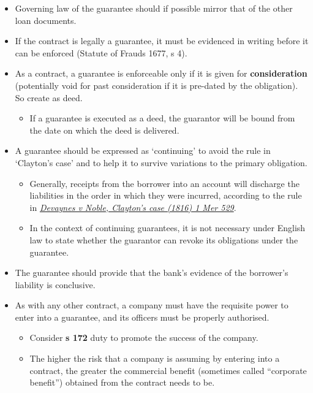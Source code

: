 \documentclass[
]{article}
\providecommand{\tightlist}{%
  \setlength{\itemsep}{0pt}\setlength{\parskip}{0pt}}
\begin{document}
\begin{itemize}
\tightlist
\item
  Governing law of the guarantee should if possible mirror that of the
  other loan documents.
\item
  If the contract is legally a guarantee, it must be evidenced in
  writing before it can be enforced (Statute of Frauds 1677, s 4).
\item
  As a contract, a guarantee is enforceable only if it is given for
  \textbf{consideration} (potentially void for past consideration if it
  is pre-dated by the obligation). So create as deed.

  \begin{itemize}
  \tightlist
  \item
    If a guarantee is executed as a deed, the guarantor will be bound
    from the date on which the deed is delivered.
  \end{itemize}
\item
  A guarantee should be expressed as `continuing' to avoid the rule in
  `Clayton's case' and to help it to survive variations to the primary
  obligation.

  \begin{itemize}
  \tightlist
  \item
    Generally, receipts from the borrower into an account will discharge
    the liabilities in the order in which they were incurred, according
    to the rule in
    \emph{\href{https://uk.westlaw.com/D-000-4111?originationContext=document\&transitionType=PLDocumentLink\&contextData=\%28sc.Default\%29\&comp=pluk}{Devaynes
    v Noble, Clayton's case (1816) 1 Mer 529}}.
  \item
    In the context of continuing guarantees, it is not necessary under
    English law to state whether the guarantor can revoke its
    obligations under the guarantee.
  \end{itemize}
\item
  The guarantee should provide that the bank's evidence of the
  borrower's liability is conclusive.
\item
  As with any other contract, a company must have the requisite power to
  enter into a guarantee, and its officers must be properly authorised.

  \begin{itemize}
  \tightlist
  \item
    Consider \textbf{s 172} duty to promote the success of the company.
  \item
    The higher the risk that a company is assuming by entering into a
    contract, the greater the commercial benefit (sometimes called
    ``corporate benefit'') obtained from the contract needs to be.


\end{itemize}
\end{itemize}
\end{document}
